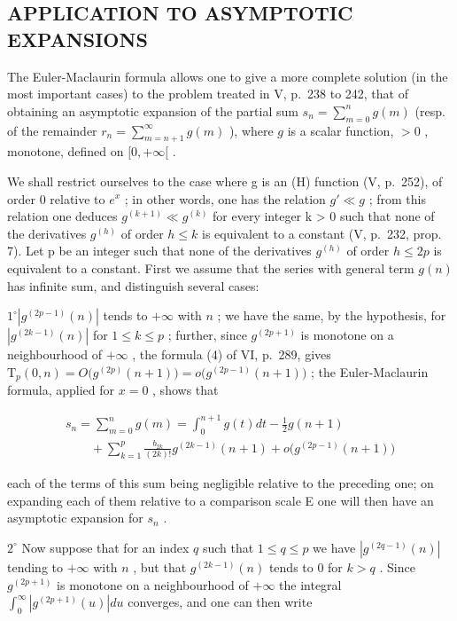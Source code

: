 \subsection{APPLICATION TO ASYMPTOTIC EXPANSIONS}

The Euler-Maclaurin formula allows one to give a more complete solution (in the most important cases) to the problem treated in V, p.~238 to 242, that of obtaining an asymptotic expansion of the partial sum \(s_n = \sum_{m=0}^{n} g(m)\) (resp. of the remainder \(r_n = \sum_{m=n+1}^{\infty} g(m)\) ), where \(g\) is a scalar function, \(> 0\) , monotone, defined on \([0, +\infty[\) .

We shall restrict ourselves to the case where g is an (H) function (V, p.~252), of order 0 relative to \(e^{x}\) ; in other words, one has the relation \(g' \ll g\) ; from this relation one deduces \(g^{(k+1)} \ll g^{(k)}\) for every integer k \textgreater{} 0 such that none of the derivatives \(g^{(h)}\) of order \(h \leqslant k\) is equivalent to a constant (V, p.~232, prop. 7). Let p be an integer such that none of the derivatives \(g^{(h)}\) of order \(h \leqslant 2p\) is equivalent to a constant. First we assume that the series with general term \(g(n)\) has infinite sum, and distinguish several cases:

\(1^{\circ}\left|g^{(2p - 1)}(n)\right|\) tends to \(+\infty\) with \(n\) ; we have the same, by the hypothesis, for \(\left|g^{(2k - 1)}(n)\right|\) for \(1\leqslant k\leqslant p\) ; further, since \(g^{(2p + 1)}\) is monotone on a neighbourhood of \(+\infty\) , the formula (4) of VI, p.~289, gives \(\mathrm{T}_p(0,n) = O\big(g^{(2p)}(n + 1)\big) = o\big(g^{(2p - 1)}(n + 1)\big)\) ; the Euler-Maclaurin formula, applied for \(x = 0\) , shows that

\[
\begin{array}{l} s _ {n} = \sum_ {m = 0} ^ {n} g (m) = \int_ {0} ^ {n + 1} g (t) d t - \frac {1}{2} g (n + 1) \\ \qquad + \sum_ {k = 1} ^ {p} \frac {b _ {2 k}}{(2 k) !} g ^ {(2 k - 1)} (n + 1) + o \big (g ^ {(2 p - 1)} (n + 1) \big) \end{array}
\]

each of the terms of this sum being negligible relative to the preceding one; on expanding each of them relative to a comparison scale E one will then have an asymptotic expansion for \(s_{n}\) .

\(2^{\circ}\) Now suppose that for an index \(q\) such that \(1 \leqslant q \leqslant p\) we have \(\left|g^{(2q-1)}(n)\right|\) tending to \(+\infty\) with \(n\) , but that \(g^{(2k-1)}(n)\) tends to 0 for \(k > q\) . Since \(g^{(2p+1)}\) is monotone on a neighbourhood of \(+\infty\) the integral \(\int_0^\infty \left|g^{(2p+1)}(u)\right| du\) converges, and one can then write

